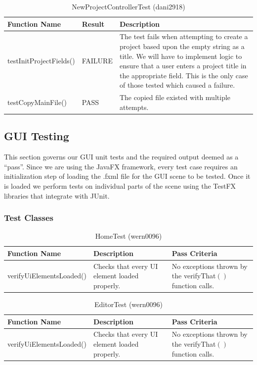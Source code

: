 \documentclass[twoside,letterpaper]{article}
\begin{document}
\begin{table}[h]
	\centering
	\caption{NewProjectControllerTest (dani2918)}
	\begin{tabular}{|p{3cm}|p{3cm}|p{9cm}|}
		\hline
		\textbf{Function Name} & \textbf{Result} & \textbf{Description}  \\\hline
		testInitProjectFields() & FAILURE & The test fails when attempting to create a project based upon the empty string as a title. We will have to implement logic to ensure that a user enters a project title in the appropriate field. This is the only case of those tested which caused a failure.
		\\\hline
		testCopyMainFile() & PASS & The copied file existed with multiple attempts.
		\\\hline
	\end{tabular}
\end{table}

\newpage

\subsection{GUI Testing}

This section governs our GUI unit tests and the required output deemed as a ``pass''. Since we are using the JavaFX framework, every test case requires an initialization step of loading the .fxml file for the GUI scene to be tested. Once it is loaded we perform tests on individual parts of the scene using the TestFX libraries that integrate with JUnit.

\subsubsection{Test Classes}

\begin{table}[h]
	\centering	
	\caption{HomeTest (wern0096)}
	\begin{tabular}{|p{4cm}|p{5cm}|p{6cm}|} 
		\hline
		\textbf{Function Name} & \textbf{Description} & \textbf{Pass Criteria}  \\\hline
		verifyUiElementsLoaded() & Checks that every UI element loaded properly. & No exceptions thrown by the verifyThat$\left(\right)$ function calls. \\\hline
	\end{tabular}
\end{table}

\begin{table}[h]
	\centering	
	\caption{EditorTest (wern0096)}
	\begin{tabular}{|p{4cm}|p{5cm}|p{6cm}|} 
		\hline
		\textbf{Function Name} & \textbf{Description} & \textbf{Pass Criteria}  \\\hline
		verifyUiElementsLoaded() & Checks that every UI element loaded properly. & No exceptions thrown by the verifyThat$\left(\right)$ function calls. \\\hline
	\end{tabular}
\end{table}
\end{document}
